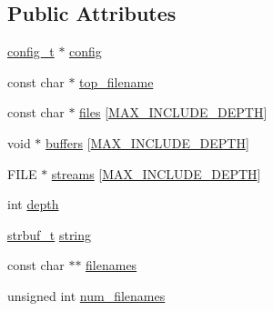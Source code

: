 \subsection*{Public Attributes}
\begin{DoxyCompactItemize}
\item 
\hyperlink{structconfig__t}{config\-\_\-t} $\ast$ \hyperlink{structscan__context_a535f3ae7e1140baf91f736e833192147}{config}
\item 
const char $\ast$ \hyperlink{structscan__context_ae3db7eaa46cd30631e3f154bdc514feb}{top\-\_\-filename}
\item 
const char $\ast$ \hyperlink{structscan__context_a2b37e18ccf435f4a0d302dd3e01c9b12}{files} \mbox{[}\hyperlink{scanctx_8h_a641f7209d924c2c4cb24420dcd631f37}{M\-A\-X\-\_\-\-I\-N\-C\-L\-U\-D\-E\-\_\-\-D\-E\-P\-T\-H}\mbox{]}
\item 
void $\ast$ \hyperlink{structscan__context_a49a22b83cacfde03f8f3ac70784ef202}{buffers} \mbox{[}\hyperlink{scanctx_8h_a641f7209d924c2c4cb24420dcd631f37}{M\-A\-X\-\_\-\-I\-N\-C\-L\-U\-D\-E\-\_\-\-D\-E\-P\-T\-H}\mbox{]}
\item 
F\-I\-L\-E $\ast$ \hyperlink{structscan__context_a42b7e86466be147d557499f45d47cfb9}{streams} \mbox{[}\hyperlink{scanctx_8h_a641f7209d924c2c4cb24420dcd631f37}{M\-A\-X\-\_\-\-I\-N\-C\-L\-U\-D\-E\-\_\-\-D\-E\-P\-T\-H}\mbox{]}
\item 
int \hyperlink{structscan__context_aad7af2747860597a923bdd8cca07bd83}{depth}
\item 
\hyperlink{structstrbuf__t}{strbuf\-\_\-t} \hyperlink{structscan__context_aa23d5c633b40966b509c91068b72fc47}{string}
\item 
const char $\ast$$\ast$ \hyperlink{structscan__context_a772a7e1bd1d4c20a03393667835557c8}{filenames}
\item 
unsigned int \hyperlink{structscan__context_a62c81b43eb67d92788088d4835aa4d04}{num\-\_\-filenames}
\end{DoxyCompactItemize}


